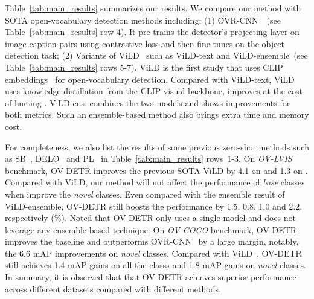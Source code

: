 \documentclass[runningheads]{llncs}
\newcommand{\methodname}{OV-DETR\xspace}
\newcommand{\rowNumber}[1]{\textcolor{Cerulean}{#1}}
\begin{document}
Table~\ref{tab:main_results} summarizes our results.
We compare our method with SOTA open-vocabulary detection methods including: (1) OVR-CNN~\cite{zareian2021open}~(see Table~\ref{tab:main_results} row \rowNumber{4}). It pre-trains the detector's projecting layer on image-caption pairs using contrastive loss and then fine-tunes on the object detection task; (2) Variants of ViLD~\cite{gu2021open} such as ViLD-text and ViLD-ensemble~(see Table~\ref{tab:main_results} rows \rowNumber{5-7}). ViLD is the first study that uses CLIP embeddings~\cite{radford2021learning} for open-vocabulary detection. Compared with ViLD-text, ViLD uses knowledge distillation from the CLIP visual backbone, improves  at the cost of hurting . ViLD-ens. combines the two models and shows improvements for both metrics. Such an ensemble-based method also brings extra time and memory cost.

For completeness, we also list the results of some previous zero-shot methods such as SB~\cite{bansal2018zero}, DELO~\cite{zhu2020don} and PL~\cite{rahman2021improved} in Table~\ref{tab:main_results} rows~\rowNumber{1-3}.
On \textit{OV-LVIS} benchmark, \methodname improves the previous SOTA ViLD by 4.1 on  and 1.3 on .
Compared with ViLD, our method will not affect the performance of \emph{base} classes when improve the \emph{novel} classes.
Even compared with the ensemble result of ViLD-ensemble, \methodname still boosts the performance by 1.5, 0.8, 1.0 and 2.2, respectively (\%).
Noted that \methodname only uses a single model and does not leverage any ensemble-based technique.
On \textit{OV-COCO} benchmark, \methodname improves the baseline and outperforms OVR-CNN~\cite{zareian2021open} by a large margin, notably, the 6.6 mAP improvements on \emph{novel} classes.
Compared with ViLD~\cite{gu2021open}, \methodname still achieves 1.4 mAP gains on all the classs and 1.8 mAP gains on \emph{novel} classes.
In summary, it is observed that that \methodname achieves superior performance across different datasets compared with different methods.
\end{document}
